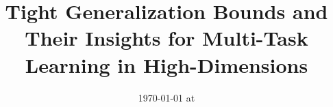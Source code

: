 \documentclass{article}
\begin{document}
\title{Tight Generalization Bounds and Their Insights for Multi-Task Learning in High-Dimensions}
\date{}
\maketitle
\date{{\ddmmyyyydate\today} at \currenttime}











\newpage
\appendix



\end{document}
